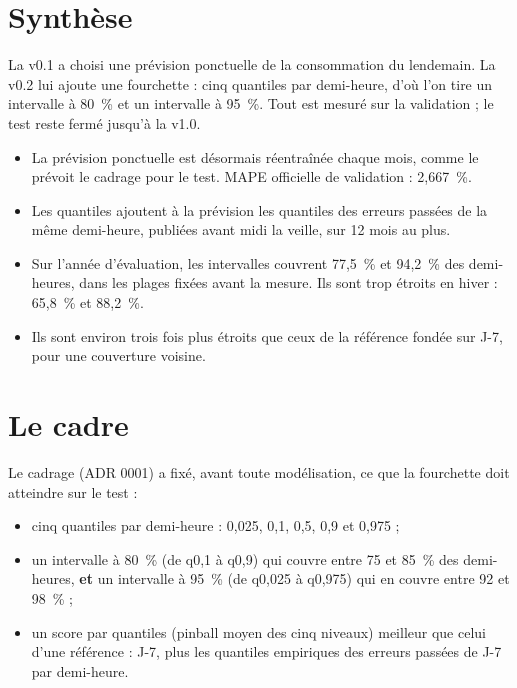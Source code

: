 \documentclass[11pt,a4paper]{article}
\begin{document}

\setcounter{tocdepth}{1}
\tableofcontents
\newpage

\section*{Synthèse}

La v0.1 a choisi une prévision ponctuelle de la consommation du lendemain. La v0.2 lui ajoute une fourchette : cinq quantiles par demi-heure, d'où l'on tire un intervalle à 80~\% et un intervalle à 95~\%. Tout est mesuré sur la validation ; le test reste fermé jusqu'à la v1.0.

\begin{itemize}
  \item La prévision ponctuelle est désormais réentraînée chaque mois, comme le prévoit le cadrage pour le test. MAPE officielle de validation : 2,667~\%.
  \item Les quantiles ajoutent à la prévision les quantiles des erreurs passées de la même demi-heure, publiées avant midi la veille, sur 12 mois au plus.
  \item Sur l'année d'évaluation, les intervalles couvrent 77,5~\% et 94,2~\% des demi-heures, dans les plages fixées avant la mesure. Ils sont trop étroits en hiver : 65,8~\% et 88,2~\%.
  \item Ils sont environ trois fois plus étroits que ceux de la référence fondée sur J-7, pour une couverture voisine.
\end{itemize}


\section{Le cadre}

Le cadrage (ADR 0001) a fixé, avant toute modélisation, ce que la fourchette doit atteindre sur le test :

\begin{itemize}
  \item cinq quantiles par demi-heure : 0,025, 0,1, 0,5, 0,9 et 0,975 ;
  \item un intervalle à 80~\% (de q0,1 à q0,9) qui couvre entre 75 et 85~\% des demi-heures, \textbf{et} un intervalle à 95~\% (de q0,025 à q0,975) qui en couvre entre 92 et 98~\% ;
  \item un score par quantiles (pinball moyen des cinq niveaux) meilleur que celui d'une référence : J-7, plus les quantiles empiriques des erreurs passées de J-7 par demi-heure.
\end{itemize}
\end{document}
